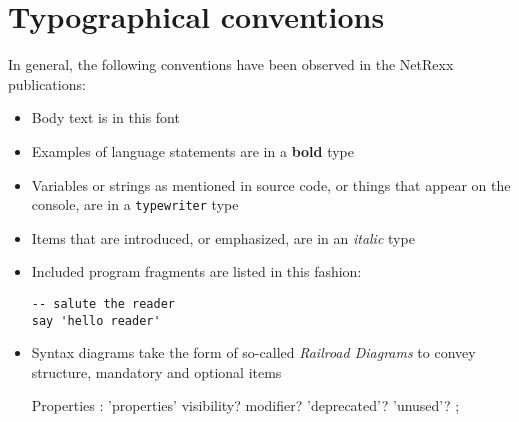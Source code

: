 \chapter{Typographical conventions}
In general, the following conventions have  been observed in the NetRexx publications:
\begin{itemize}
\item Body text is in this font
\item Examples of language statements are in a \textbf{bold} type
\item Variables or strings as mentioned in source code, or things that appear on the console, are in a \texttt{typewriter} type
\item Items that are introduced, or emphasized, are in an \emph{italic} type
\item Included program fragments are listed in this fashion:
\begin{lstlisting}[label=example,caption=Example Listing]
-- salute the reader
say 'hello reader'
\end{lstlisting}
\item Syntax diagrams take the form of so-called \emph{Railroad Diagrams} to convey structure, mandatory and optional items
\begin{rail}
Properties : 'properties'   visibility? modifier? 'deprecated'? 'unused'?
               ;
\end{rail}
\end{itemize}